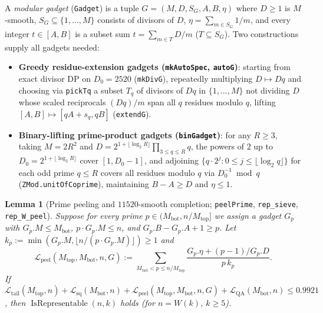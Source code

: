 \documentclass[11pt,a4paper]{amsart}
\newtheorem{lemma}{Lemma}
\theoremstyle{remark}
\newcommand{\Rep}{\operatorname{IsRepresentable}}
\begin{document}
A \emph{modular gadget} (\texttt{Gadget}) is a tuple $G = (M, D, S_G, A, B, \eta)$ where $D \ge 1$ is $M$-smooth, $S_G \subseteq \{1, \dots, M\}$ consists of divisors of $D$, $\eta = \sum_{m \in S_G} 1/m$, and every integer $t \in [A, B]$ is a subset sum $t = \sum_{m \in T} D / m$ ($T \subseteq S_G$). Two constructions supply all gadgets needed:
\begin{itemize}
\item \textbf{Greedy residue-extension gadgets (\texttt{mkAutoSpec}, \texttt{autoG})}: starting from exact divisor DP on $D_0 = 2520$ (\texttt{mkDivG}), repeatedly multiplying $D \mapsto D q$ and choosing via \texttt{pickTq} a subset $T_q$ of divisors of $D q$ in $\{1, \dots, M\}$ not dividing $D$ whose scaled reciprocals $(D q)/m$ span all $q$ residues modulo $q$, lifting $[A, B] \mapsto [q A + s_q, q B]$ (\texttt{extendG}).
\item \textbf{Binary-lifting prime-product gadgets (\texttt{binGadget})}: for any $R \ge 3$, taking $M = 2 R^2$ and $D = 2^{1 + \lfloor \log_2 R \rfloor} \prod_{3 \le q \le R} q$, the powers of $2$ up to $D_0 = 2^{1 + \lfloor \log_2 R \rfloor}$ cover $[1, D_0 - 1]$, and adjoining $\{q \cdot 2^j : 0 \le j \le \lfloor \log_2 q \rfloor\}$ for each odd prime $q \le R$ covers all residues modulo $q$ via $D_0^{-1} \bmod q$ (\texttt{ZMod.unitOfCoprime}), maintaining $B - A \ge D$ and $\eta \le 1$.
\end{itemize}

\begin{lemma}[Prime peeling and $11520$-smooth completion; \texttt{peelPrime}, \texttt{rep\_sieve}, \texttt{rep\_W\_peel}]\label{lem:peel}
Suppose for every prime $p \in (M_{\mathrm{bot}}, n / M_{\mathrm{top}}]$ we assign a gadget $G_p$ with $G_p.M \le M_{\mathrm{bot}}$, $p \cdot G_p.M \le n$, and $G_p.B - G_p.A + 1 \ge p$. Let $k_p := \min(G_p.M, \lfloor n / (p \cdot G_p.M) \rfloor) \ge 1$ and
\[
\mathcal{L}_{\mathrm{peel}}(M_{\mathrm{top}}, M_{\mathrm{bot}}, n, G) := \sum_{M_{\mathrm{bot}} < p \le n / M_{\mathrm{top}}} \frac{G_p.\eta + (p - 1) / G_p.D}{p \, k_p}.
\]
If $\mathcal{L}_{\mathrm{tail}}(M_{\mathrm{top}}, n) + \mathcal{L}_{\mathrm{sq}}(M_{\mathrm{bot}}, n) + \mathcal{L}_{\mathrm{peel}}(M_{\mathrm{top}}, M_{\mathrm{bot}}, n, G) + \mathcal{L}_{\mathrm{QA}}(M_{\mathrm{bot}}, n) \le 0.9921$, then $\Rep(n, k)$ holds (for $n = W(k)$, $k \ge 5$).
\end{lemma}
\end{document}
